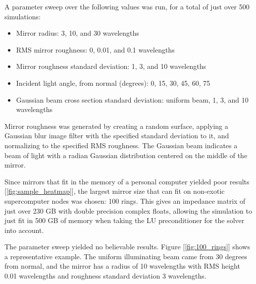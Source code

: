 \documentclass[etd,twoside,senior,noacknowledgments]{BYUPhys}
\begin{document}
A parameter sweep over the following values was run, for a total of just over 500 simulations:

\begin{itemize}
  \item Mirror radius: 3, 10, and 30 wavelengths
  \item RMS mirror roughness: 0, 0.01, and 0.1 wavelengths
  \item Mirror roughness standard deviation: 1, 3, and 10 wavelengths
  \item Incident light angle, from normal (degrees): 0, 15, 30, 45, 60, 75
  \item Gaussian beam cross section standard deviation: uniform beam, 1, 3, and 10 wavelengths
\end{itemize}

Mirror roughness was generated by creating a random surface, applying a Gaussian blur image filter with the specified standard deviation to it, and normalizing to the specified RMS roughness. The Gaussian beam indicates a beam of light with a radian Gaussian distribution centered on the middle of the mirror.

Since mirrors that fit in the memory of a personal computer yielded poor results [\ref{fig:sample_heatmap}], the largest mirror size that can fit on non-exotic supercomputer nodes was chosen: 100 rings. This gives an impedance matrix of just over 230 GB with double precision complex floats, allowing the simulation to just fit in 500 GB of memory when taking the LU preconditioner for the solver into account.

The parameter sweep yielded no believable results. Figure [\ref{fig:100_rings}] shows a representative example. The uniform illuminating beam came from 30 degrees from normal, and the mirror has a radius of 10 wavelengths with RMS height 0.01 wavelengths and roughness standard deviation 3 wavelengths.
\end{document}
